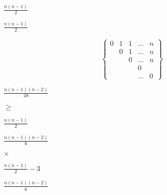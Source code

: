 \documentclass[10pt]{book}
\begin{document}
\begin{mdSnippets}
\begin{mdInlineSnippet}
$\frac{n(n-1)}{2}$\end{mdInlineSnippet}%
\begin{mdInlineSnippet}%
$\frac{n(n-1)}{2}$\end{mdInlineSnippet}%
\begin{mdDisplaySnippet}%
\[ \left\{
 \begin{matrix}
   0 & 1 & 1 & ... & n\\
     & 0 & 1 & ... & n\\
     &   & 0 & ... & n\\
     &   &   & 0 \\
     &   &   & ... & 0
  \end{matrix}
  \right\}
\]%
\end{mdDisplaySnippet}%
\begin{mdInlineSnippet}[d5a4db092f12f46f8dc84781c4c54bc0]%
$\frac {n( n - 1 )( n - 2 ) $\end{mdInlineSnippet}%
\begin{mdInlineSnippet}[f9d27f76c022611181620b242288ec33]%
$\frac{n( n - 1 )( n - 2) }{48}$\end{mdInlineSnippet}%
\begin{mdInlineSnippet}%
$\geq$\end{mdInlineSnippet}%
\begin{mdInlineSnippet}%
$\frac{n(n-1)}{2}$\end{mdInlineSnippet}%
\begin{mdInlineSnippet}%
$ \frac{n( n - 1 )( n - 2 )}{6}$\end{mdInlineSnippet}%
\begin{mdInlineSnippet}[19af21bb9b4b023be42204a69025e8bd]%
$ \times $\end{mdInlineSnippet}%
\begin{mdInlineSnippet}[2c656429ad279476c9231d8b7501b659]%
$\frac{n(n-1)}{2} -3$\end{mdInlineSnippet}%
\begin{mdInlineSnippet}%
$ \frac{n( n - 1 )( n - 2 )}{6}$\end{mdInlineSnippet}%

\end{mdSnippets}
\end{document}
